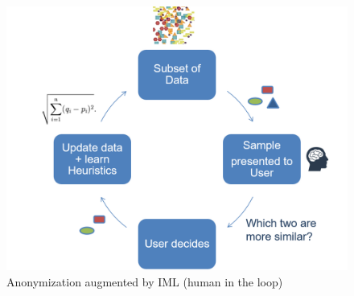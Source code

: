 	\begin{figure}[ht]
		\label{fig_anonIML}
		\begin{center}
			\includegraphics[width=1\textwidth]{figures/anonym/anonIML}
			\caption{Anonymization augmented by IML (human in the loop)}
		\end{center}
	\end{figure}


